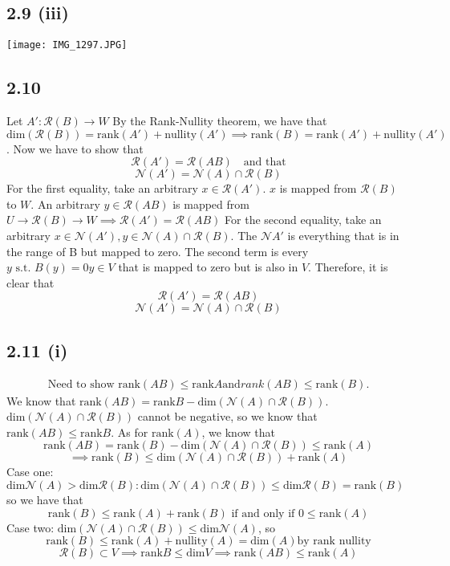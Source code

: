 \documentclass[letterpaper,12pt]{article}
\theoremstyle{definition}
\begin{document}
\subsection*{2.9 (iii)}

\texttt{[image: IMG\_1297.JPG]}

\subsection*{2.10}
Let $A': \mathscr{R} (B) \rightarrow W$
By the Rank-Nullity theorem, we have that $\text{dim} (\mathscr{R} (B))= \text{rank}(A') + \text{nullity} (A') \implies \text{rank} (B)= \text{rank}(A') + \text{nullity} (A')$.
Now we have to show that 
\[\mathscr{R}(A') = \mathscr{R} (AB) \quad \text{and that} \]
\[\mathscr{N}(A') = \mathscr{N} (A) \cap \mathscr{R} (B)\]
For the first equality, take an arbitrary $x \in \mathscr{R} (A')$. $x$ is mapped from $\mathscr{R} (B)$ to $W$. 
An arbitrary $y \in \mathscr{R} (AB)$ is mapped from $U\rightarrow \mathscr{R} (B) \rightarrow W \implies \mathscr{R} (A') =\mathscr{R} (AB)$
For the second equality, take an arbitrary $x \in \mathscr{N} (A'), y \in \mathscr{N} (A) \cap \mathscr{R} (B)$. The $\mathscr{N} A'$ is everything that is in the range of B but mapped to zero. The second term is every $y \text{ s.t. } B(y) = 0 y \in V$ that is mapped to zero but is also in $V$. Therefore, it is clear that
\[\mathscr{R}(A') = \mathscr{R} (AB)  \]
\[\mathscr{N}(A') = \mathscr{N} (A) \cap \mathscr{R} (B)\]



\subsection*{2.11 (i)}
\begin{align*}
    \text{Need to show rank} (AB) \leq \text{rank} A \text{and} rank(AB) \leq \text{rank} (B).  
\end{align*}
We know that $\text{rank} (AB) = \text{rank} B - \text{dim} (\mathscr{N} (A) \cap \mathscr{R} (B))$.
$\text{dim} (\mathscr{N} (A) \cap \mathscr{R} (B))$ cannot be negative, so we know that $\text{rank} (AB) \leq \text{rank} B$.
As for $\text{rank} (A)$, we know that 
\[\text{rank} (AB) = \text{rank} (B) - \text{dim} (\mathscr{N} (A) \cap \mathscr{R} (B)) \leq \text{rank} (A)\]
\[\implies \text{rank} (B) \leq \text{dim} (\mathscr{N} (A) \cap \mathscr{R} (B)) + \text{rank} (A)\]
Case one: $\text{dim} \mathscr{N} (A) > \text{dim} \mathscr{R} (B): \text{dim} (\mathscr{N} (A) \cap \mathscr{R} (B)) \leq \text{dim} \mathscr{R} (B) = \text{rank} (B)$ so we have that
\[ \text{rank} (B) \leq \text{rank} (A) + \text{rank} (B) \text{ if and only if } 0 \leq \text{rank} (A)\]
Case two: $\text{dim} (\mathscr{N} (A) \cap \mathscr{R} (B)) \leq \text{dim} \mathscr{N} (A)$,
so \[\text{rank} (B) \leq \text{rank} (A) + \text{nullity} (A) = \text{dim} (A) \text{by rank nullity} \]
\[\mathscr{R} (B) \subset V \implies \text{rank} B \leq \text{dim} V \implies \text{rank} (AB) \leq  \text{rank} (A)\]
\end{document}
